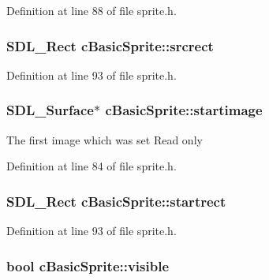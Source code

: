 Definition at line 88 of file sprite.\-h.

\hypertarget{classc_basic_sprite_a595a3142b6008d8484a91c44ea5f0e8f}{
\subsubsection[{srcrect}]{\setlength{\rightskip}{0pt plus 5cm}S\-D\-L\-\_\-\-Rect c\-Basic\-Sprite\-::srcrect}}\label{classc_basic_sprite_a595a3142b6008d8484a91c44ea5f0e8f}


Definition at line 93 of file sprite.\-h.

\hypertarget{classc_basic_sprite_abbe64a52b3e23c03246631e63382d1d5}{
\subsubsection[{startimage}]{\setlength{\rightskip}{0pt plus 5cm}S\-D\-L\-\_\-\-Surface$\ast$ c\-Basic\-Sprite\-::startimage}}\label{classc_basic_sprite_abbe64a52b3e23c03246631e63382d1d5}
The first image which was set Read only 

Definition at line 84 of file sprite.\-h.

\hypertarget{classc_basic_sprite_ad29c8fafc2c544c30cf028a58e93d063}{
\subsubsection[{startrect}]{\setlength{\rightskip}{0pt plus 5cm}S\-D\-L\-\_\-\-Rect c\-Basic\-Sprite\-::startrect}}\label{classc_basic_sprite_ad29c8fafc2c544c30cf028a58e93d063}


Definition at line 93 of file sprite.\-h.

\hypertarget{classc_basic_sprite_a1af0eebcb86cb160a384fb8acea2d773}{
\subsubsection[{visible}]{\setlength{\rightskip}{0pt plus 5cm}bool c\-Basic\-Sprite\-::visible}}\label{classc_basic_sprite_a1af0eebcb86cb160a384fb8acea2d773}


